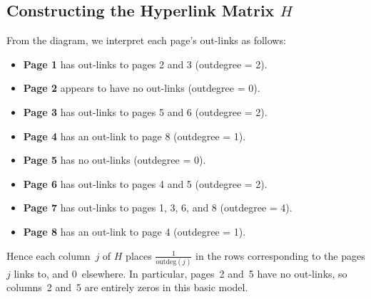\documentclass{article}
\begin{document}
\subsection{Constructing the Hyperlink Matrix $H$}
\label{sec:Fig4.4Matrix}

From the diagram, we interpret each page's out-links as follows:
\begin{itemize}
  \item \textbf{Page 1} has out-links to pages 2 and 3 (outdegree = 2).
  \item \textbf{Page 2} appears to have no out-links (outdegree = 0).
  \item \textbf{Page 3} has out-links to pages 5 and 6 (outdegree = 2).
  \item \textbf{Page 4} has an out-link to page 8 (outdegree = 1).
  \item \textbf{Page 5} has no out-links (outdegree = 0).
  \item \textbf{Page 6} has out-links to pages 4 and 5 (outdegree = 2).
  \item \textbf{Page 7} has out-links to pages 1, 3, 6, and 8 (outdegree = 4).
  \item \textbf{Page 8} has an out-link to page 4 (outdegree = 1).
\end{itemize}
Hence each column~$j$ of $H$ places $\tfrac{1}{\text{outdeg}(j)}$ in the rows 
corresponding to the pages $j$ links to, and $0$~elsewhere. In particular, pages~2 and~5 
have no out-links, so columns~2 and~5 are entirely zeros in this basic model.

\bigskip
\end{document}

